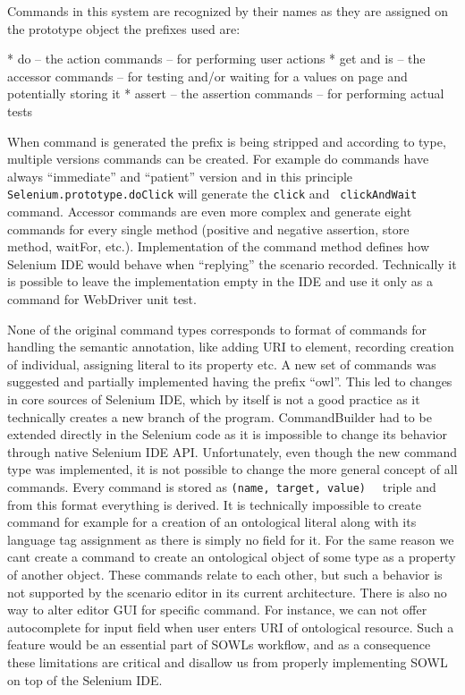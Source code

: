 Commands in this system are recognized by their names as they are assigned on
the prototype object the prefixes used are: 

\begitems
  * do -- the action commands -- for performing user actions
  * get and is -- the accessor commands -- for testing and/or waiting for a
    values on page and potentially storing it
  * assert -- the assertion commands -- for performing actual tests
\enditems

When command is generated the prefix is being stripped and according to type,
multiple versions commands can be created. For example do commands have always
``immediate'' and ``patient'' version and in this principle {\tt
Selenium.prototype.doClick} will generate the {\tt click} and {\tt
clickAndWait} command. Accessor commands are even more complex and generate
eight commands for every single method (positive and negative assertion, store
method, waitFor, etc.). Implementation of the command method defines how
Selenium IDE would behave when ``replying'' the scenario recorded. Technically it
is possible to leave the implementation empty in the IDE and use it only as a
command for WebDriver unit test. 

None of the original command types corresponds to format of commands for
handling the semantic annotation, like adding URI to element, recording
creation of individual, assigning literal to its property etc. A new set of
commands was suggested and partially implemented having the prefix ``owl''.
This led to changes in core sources of Selenium IDE, which by itself is not a good practice
as it technically creates a new branch of the program. CommandBuilder had to be
extended directly in the Selenium code as it is impossible to change its
behavior through native Selenium IDE API. Unfortunately, even though the new
command type was implemented, it is not possible to change the more general
concept of all commands. Every command is stored as {\tt (name, target, value)
}~ triple and from this format everything is
derived. It is technically impossible to create command for example for a
creation of an ontological literal 
along with its language tag assignment as there is simply no field for it. For the same
reason we cant create a command to create an ontological object of some type as
a property of another object.  These commands relate to each other, but such a
behavior is not supported by the scenario editor in its current architecture.
There is also no way to alter editor GUI for specific command. For instance, we
can not offer autocomplete for input field when user enters URI of ontological
resource. Such a feature would be an essential part of SOWLs workflow, and as
a consequence these limitations are critical and disallow us from properly
implementing SOWL on top of the Selenium IDE. 


